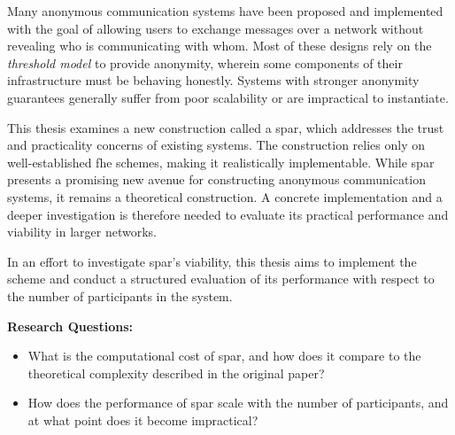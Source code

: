 \noindent
Many anonymous communication systems have been proposed and implemented with the goal of allowing users to exchange messages over a network without revealing who is communicating with whom. Most of these designs %
rely on the \emph{threshold model} to provide anonymity, wherein some components of their infrastructure must be behaving honestly. Systems with stronger anonymity guarantees %
generally suffer from poor scalability or are impractical to instantiate. %

This thesis examines a new construction called a \gls{spar}, which addresses the trust and practicality concerns of existing systems. The construction relies only on well-established \gls{fhe} schemes, making it realistically implementable. While \gls{spar} presents a promising new avenue for constructing anonymous communication systems, it remains a theoretical construction. A concrete implementation and a deeper investigation is therefore needed to evaluate its practical performance and viability in larger networks.

In an effort to investigate \gls{spar}'s viability, this thesis aims to implement the scheme %
and conduct a structured evaluation of its performance with respect to the number of participants in the system. 

\noindent
\textbf{Research Questions:}
\begin{itemize}
    \item What is the computational cost of \gls{spar}, and how does it compare to the theoretical complexity described in the original paper?
    \item How does the performance of \gls{spar} scale with the number of participants, and at what point does it become impractical?
\end{itemize}


\vspace{.25cm}